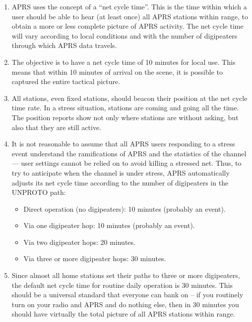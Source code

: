 \begin {enumerate}

\item APRS uses the concept of a “net cycle time”. This is the time within
which a user should be able to hear (at least once) all APRS stations
within range, to obtain a more or less complete picture of APRS activity.
The net cycle time will vary according to local conditions and with the
number of digipeaters through which APRS data travels.

\item The objective is to have a net cycle time of 10 minutes for local use. This
means that within 10 minutes of arrival on the scene, it is possible to
captured the entire tactical picture.

\item  All stations, even fixed stations, should beacon their position at the net
cycle time rate. In a stress situation, stations are coming and going all the
time. The position reports show not only where stations are without
asking, but also that they are still active.

\item It is not reasonable to assume that all APRS users responding to a stress
event understand the ramifications of APRS and the statistics of the
channel — user settings cannot be relied on to avoid killing a stressed
net. Thus, to try to anticipate when the channel is under stress, APRS
automatically adjusts its net cycle time according to the number of
digipeaters in the UNPROTO path:

\begin{itemize}

\item Direct operation (no digipeaters): 10 minutes (probably an
event).

\item Via one digipeater hop: 10 minutes (probably an event).

\item Via two digipeater hops: 20 minutes.

\item Via three or more digipeater hops: 30 minutes.

\end{itemize}

\item Since almost all home stations set their paths to three or more
digipeaters, the default net cycle time for routine daily operation is
30 minutes. This should be a universal standard that everyone can bank
on -- if you routinely turn on your radio and APRS and do nothing
else, then in 30 minutes you should have virtually the total picture
of all APRS stations within range.


\end{enumerate}
